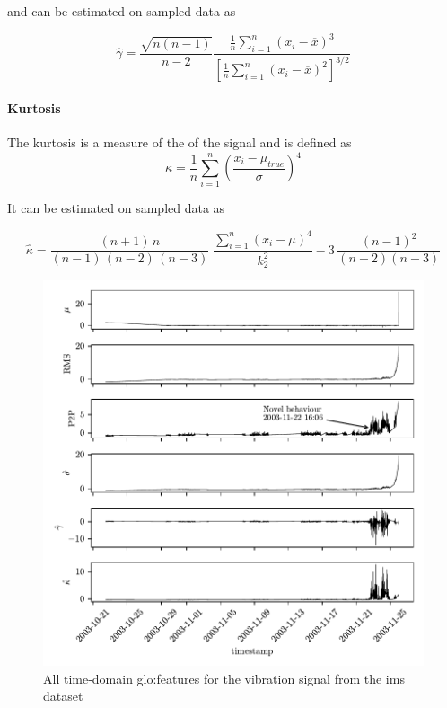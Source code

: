 and can be estimated on sampled data as

\begin{equation}
  \hat{\gamma} = \frac{\sqrt{n(n-1)}}{n-2} \frac{\tfrac{1}{n} \sum_{i=1}^n (x_i-\overline{x})^3}{\left[\tfrac{1}{n} \sum_{i=1}^n (x_i-\overline{x})^2 \right]^{3/2}}
\end{equation}

\paragraph{Kurtosis}
The kurtosis is a measure of the  of the signal and is defined as
\begin{equation}
    \kappa = \frac{1}{n}\sum_{i=1}^n \left(\frac{x_i - \mu_{true}}{\sigma}\right)^4
\end{equation}

It can be estimated on sampled data as

\begin{equation}
  \hat{\kappa} = \frac{(n+1)\,n}{(n-1)\,(n-2)\,(n-3)} \; \frac{\sum_{i=1}^n (x_i - \mu)^4}{k_2^2} - 3\,\frac{(n-1)^2}{(n-2) (n-3)}
\end{equation}

\begin{figure}
    \centering
    \includegraphics[scale=1]{images/FeatureExtraction/TDfeatures.pdf}
    \caption{All time-domain \gls{glo:feature}s for the  vibration signal from the \gls{ims} dataset}
    \label{fig:IMS_TD_features}
\end{figure}

